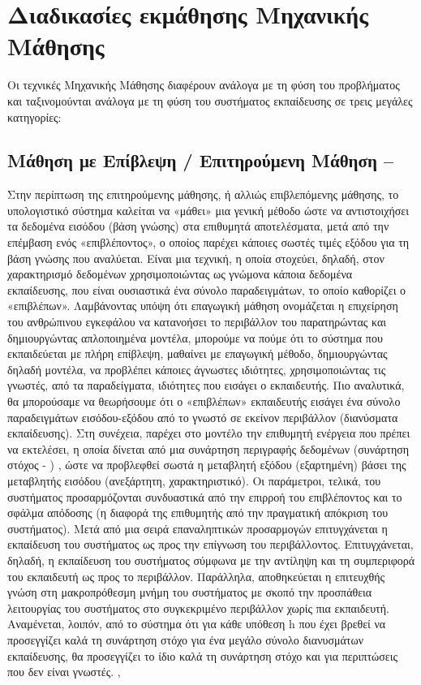 \section{Διαδικασίες εκμάθησης Μηχανικής Μάθησης}
Οι τεχνικές Μηχανικής Μάθησης διαφέρουν ανάλογα με τη φύση του προβλήματος και ταξινομούνται ανάλογα με τη φύση του συστήματος εκπαίδευσης σε τρεις μεγάλες κατηγορίες:


\subsection{Μάθηση με Επίβλεψη / Επιτηρούμενη Μάθηση – }

Στην περίπτωση της επιτηρούμενης μάθησης, ή αλλιώς επιβλεπόμενης μάθησης, το υπολογιστικό σύστημα καλείται να  «μάθει» μια γενική μέθοδο ώστε να αντιστοιχήσει τα δεδομένα εισόδου (βάση γνώσης) στα επιθυμητά αποτελέσματα, μετά από την επέμβαση ενός «επιβλέποντος», ο οποίος παρέχει κάποιες σωστές τιμές εξόδου για τη βάση γνώσης που αναλύεται. Είναι μια τεχνική, η οποία στοχεύει, δηλαδή, στον χαρακτηρισμό δεδομένων χρησιμοποιώντας ως γνώμονα κάποια δεδομένα εκπαίδευσης, που είναι ουσιαστικά ένα σύνολο παραδειγμάτων, το οποίο καθορίζει ο «επιβλέπων». \cite{3.13}
Λαμβάνοντας υπόψη ότι επαγωγική μάθηση ονομάζεται η επιχείρηση του ανθρώπινου εγκεφάλου να κατανοήσει το περιβάλλον του παρατηρώντας και δημιουργώντας απλοποιημένα μοντέλα, μπορούμε να πούμε ότι το σύστημα που εκπαιδεύεται με πλήρη επίβλεψη, μαθαίνει με επαγωγική μέθοδο, δημιουργώντας δηλαδή μοντέλα, να προβλέπει κάποιες άγνωστες ιδιότητες, χρησιμοποιώντας τις γνωστές, από τα παραδείγματα, ιδιότητες που εισάγει ο εκπαιδευτής. Πιο αναλυτικά, θα μπορούσαμε να θεωρήσουμε ότι ο «επιβλέπων» εκπαιδευτής εισάγει ένα σύνολο παραδειγμάτων εισόδου-εξόδου από το γνωστό σε εκείνον περιβάλλον (διανύσματα εκπαίδευσης). Στη συνέχεια, παρέχει στο μοντέλο την επιθυμητή ενέργεια που πρέπει να εκτελέσει, η οποία δίνεται από μια συνάρτηση περιγραφής δεδομένων (συνάρτηση στόχος - ) , ώστε να προβλεφθεί σωστά η μεταβλητή εξόδου (εξαρτημένη) βάσει της μεταβλητής εισόδου (ανεξάρτητη, χαρακτηριστικό). Οι παράμετροι, τελικά, του συστήματος προσαρμόζονται συνδυαστικά από την επιρροή του επιβλέποντος και το σφάλμα απόδοσης (η διαφορά της επιθυμητής από την πραγματική απόκριση του συστήματος). Μετά από μια σειρά επαναληπτικών προσαρμογών επιτυγχάνεται η εκπαίδευση του συστήματος ως προς την επίγνωση του περιβάλλοντος. Επιτυγχάνεται, δηλαδή, η εκπαίδευση του συστήματος σύμφωνα με την αντίληψη και τη συμπεριφορά του εκπαιδευτή ως προς το περιβάλλον. Παράλληλα, αποθηκεύεται η επιτευχθής γνώση στη μακροπρόθεσμη μνήμη του συστήματος με σκοπό την προσπάθεια λειτουργίας του συστήματος στο συγκεκριμένο περιβάλλον χωρίς πια εκπαιδευτή. Αναμένεται, λοιπόν, από το σύστημα ότι για κάθε υπόθεση h που έχει βρεθεί να προσεγγίζει καλά τη συνάρτηση στόχο για ένα μεγάλο σύνολο διανυσμάτων εκπαίδευσης, θα προσεγγίζει το ίδιο καλά τη συνάρτηση στόχο και για περιπτώσεις που δεν είναι γνωστές. \cite{3.12}, \cite{3.14}


